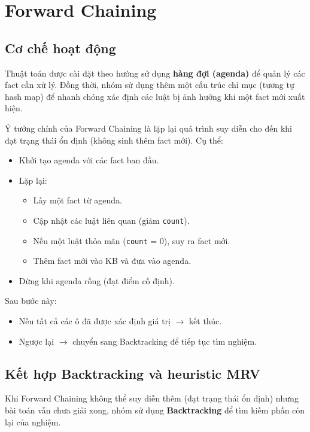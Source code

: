 \section{Forward Chaining}

\subsection{Cơ chế hoạt động}

Thuật toán được cài đặt theo hướng sử dụng \textbf{hàng đợi (agenda)} để quản lý các fact cần xử lý. Đồng thời, nhóm sử dụng thêm một cấu trúc chỉ mục (tương tự hash map) để nhanh chóng xác định các luật bị ảnh hưởng khi một fact mới xuất hiện.

Ý tưởng chính của Forward Chaining là lặp lại quá trình suy diễn cho đến khi đạt trạng thái ổn định (không sinh thêm fact mới). Cụ thể:

\begin{itemize}
    \item Khởi tạo agenda với các fact ban đầu.
    \item Lặp lại:
    \begin{itemize}
        \item Lấy một fact từ agenda.
        \item Cập nhật các luật liên quan (giảm \texttt{count}).
        \item Nếu một luật thỏa mãn (\texttt{count} = 0), suy ra fact mới.
        \item Thêm fact mới vào KB và đưa vào agenda.
    \end{itemize}
    \item Dừng khi agenda rỗng (đạt điểm cố định).
\end{itemize}

Sau bước này:
\begin{itemize}
    \item Nếu tất cả các ô đã được xác định giá trị $\rightarrow$ kết thúc.
    \item Ngược lại $\rightarrow$ chuyển sang Backtracking để tiếp tục tìm nghiệm.
\end{itemize}

\subsection{Kết hợp Backtracking và heuristic MRV}

Khi Forward Chaining không thể suy diễn thêm (đạt trạng thái ổn định) nhưng bài toán vẫn chưa giải xong, nhóm sử dụng \textbf{Backtracking} để tìm kiếm phần còn lại của nghiệm.

